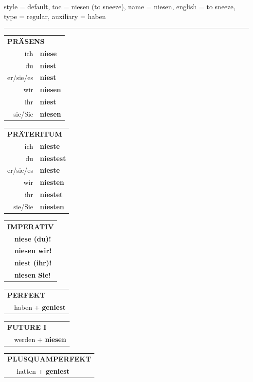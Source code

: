 \begin{verbentry}{
  style = {default},
  toc = {niesen (to sneeze)},
  name = {niesen},
  english = {to sneeze},
  type = {regular},
  auxiliary = {haben}
}


\vspace{5pt}
\hrule
\vspace{5pt}

\begin{tabular}{rl}
\multicolumn{2}{l}{\textbf{PRÄSENS}}\\
ich & \textbf{niese}\\
du & \textbf{niest}\\
er/sie/es & \textbf{niest}\\
wir & \textbf{niesen}\\
ihr & \textbf{niest}\\
sie/Sie & \textbf{niesen}\\
\end{tabular}
\hfill
\begin{tabular}{rl}
\multicolumn{2}{l}{\textbf{PRÄTERITUM}}\\
ich & \textbf{nieste}\\
du & \textbf{niestest}\\
er/sie/es & \textbf{nieste}\\
wir & \textbf{niesten}\\
ihr & \textbf{niestet}\\
sie/Sie & \textbf{niesten}\\
\end{tabular}
\hfill
\begin{tabular}{rl}
\multicolumn{2}{l}{\textbf{IMPERATIV}}\\
& \textbf{niese (du)!}\\
& \textbf{niesen wir!}\\
& \textbf{niest (ihr)!}\\
& \textbf{niesen Sie!}\\
\end{tabular}

\vspace{10pt}

\begin{tabular}{rl}
\multicolumn{2}{l}{\textbf{PERFEKT}}\\
& haben + \textbf{geniest}\\
\end{tabular}
\hfill
\begin{tabular}{rl}
\multicolumn{2}{l}{\textbf{FUTURE I}}\\
& werden + \textbf{niesen}\\
\end{tabular}
\hfill
\begin{tabular}{rl}
\multicolumn{2}{l}{\textbf{PLUSQUAMPERFEKT}}\\
& hatten + \textbf{geniest}\\
\end{tabular}


\end{verbentry}

